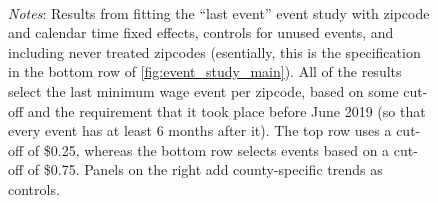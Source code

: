 \begin{figure}[htb]
\begin{subfigure}{0.5\textwidth}
    \end{subfigure}\\
    \begin{minipage}{.95\textwidth} \footnotesize
		\vspace{2mm} 
		\textit{Notes}: Results from fitting the ``last event'' event study with zipcode and calendar time fixed effects, controls for unused events, and including never treated zipcodes (esentially, this is the specification in the bottom row of \ref{fig:event_study_main}). All of the results select the last minimum wage event per zipcode, based on some cut-off and the requirement that it took place before June 2019 (so that every event has at least 6 months after it). The top row uses a cut-off of \$0.25, whereas the bottom row selects events based on a cut-off of \$0.75. Panels on the right add county-specific trends as controls.
	\end{minipage}
\end{figure}

